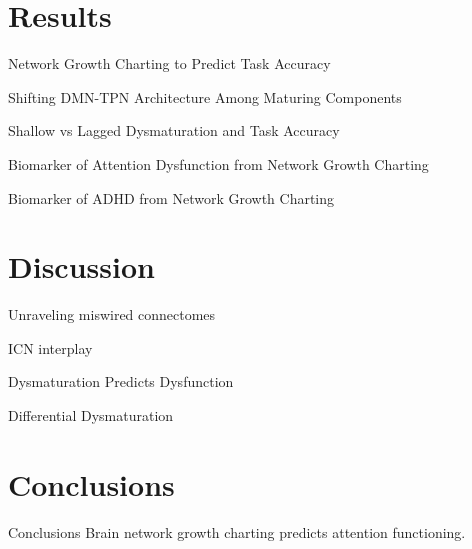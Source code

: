 \documentclass[presentation]{beamer}
\begin{document}
\section{Results}
\label{sec:orgheadline23}
\begin{frame}[label={sec:orgheadline18}]{Network Growth Charting to Predict Task Accuracy}
\end{frame}
\begin{frame}[label={sec:orgheadline19}]{Shifting DMN-TPN Architecture Among Maturing Components}
\end{frame}
\begin{frame}[label={sec:orgheadline20}]{Shallow vs Lagged Dysmaturation and Task Accuracy}
\end{frame}
\begin{frame}[label={sec:orgheadline21}]{Biomarker of Attention Dysfunction from Network Growth Charting}
\end{frame}
\begin{frame}[label={sec:orgheadline22}]{Biomarker of ADHD from Network Growth Charting}
\end{frame}
\section{Discussion}
\label{sec:orgheadline28}
\begin{frame}[label={sec:orgheadline24}]{Unraveling miswired connectomes}
\end{frame}
\begin{frame}[label={sec:orgheadline25}]{ICN interplay}
\end{frame}
\begin{frame}[label={sec:orgheadline26}]{Dysmaturation Predicts Dysfunction}
\end{frame}
\begin{frame}[label={sec:orgheadline27}]{Differential Dysmaturation}
\end{frame}
\section{Conclusions}
\label{sec:orgheadline30}
\begin{frame}[label={sec:orgheadline29}]{Conclusions}
Brain network growth charting predicts attention functioning.
\end{frame}
\end{document}
